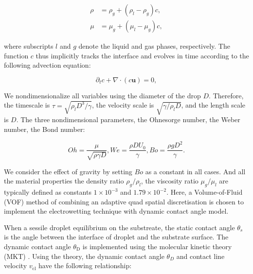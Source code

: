 \documentclass[lineno]{cls/jfm}
\begin{document}
\begin{equation}
  \begin{aligned}
  \rho &= \rho_{g} + (\rho_{l} - \rho_{g})c, \\
  \mu  &= \mu_{g} + (\mu_{l} - \mu_{g})c,
  \end{aligned}
  \label{volume fraction function}
\end{equation}

\noindent where subscripts $l$ and $g$ denote the liquid and gas phases, respectively. The function $c$ thus implicitly tracks the interface and evolves in time according to the following advection equation:

\begin{equation}
  \partial_t c + \nabla \cdot (c \boldsymbol{u}) = 0,
  \label{advection equation}
\end{equation}

\noindent We nondimensionalize all variables using the diameter of the drop $D$. Therefore, the timescale is $\tau=\sqrt{\rho_l D^3 / \gamma}$, the velocity scale is $\sqrt{\gamma/\rho_l D}$, and the length scale is $D$. The three nondimensional parameters, the Ohnesorge number, the Weber number, the Bond number:

\begin{equation}
  Oh = \frac{\mu}{\sqrt{\rho \gamma D}}, We = \frac{\rho D U_0}{\gamma}, Bo = \frac{\rho g D^2}{\gamma} .
  \label{advection equation}
\end{equation}


\noindent We consider the effect of gravity by setting $Bo$ as a constant in all cases. And all the material properties the density ratio $\rho_g/\rho_l$, the viscosity ratio $\mu_g/\mu_l$ are typically defined as constants $1 \times 10^{-3}$ and $1.79 \times 10^{-2}$. Here, a Volume-of-Fluid (VOF) method of combining an adaptive quad spatial discretisation \citep{popinet_gerris_2003, popinet_accurate_2009,afkhami_mesh-dependent_2009,afkhami_transition_2018} is chosen to implement the electrowetting technique with dynamic contact angle model. 


When a sessile droplet equilibrium on the substreate, the static contact angle $\theta_s$ is the angle between the interface of droplet and the substrate surface. The dynamic contact angle $\theta_{\mathrm{D}}$ is implemented using the molecular kinetic theory (MKT) \citep{duvivier_toward_2013,cheng_numerical_2018,kumar_droplet_2024}. Using the theory, the dynamic contact angle $\theta_D$ and contact line velocity $v_{\mathrm{cl}}$ have the following relationship:
\end{document}
